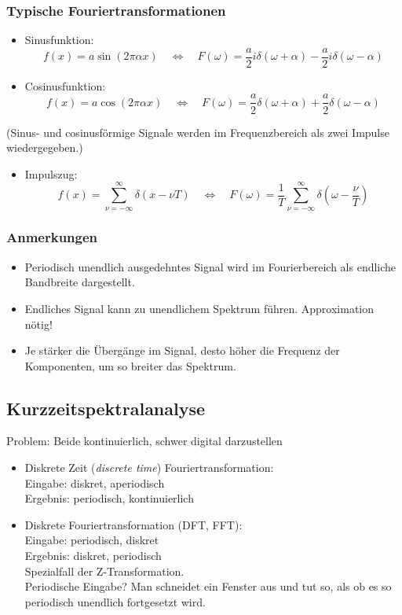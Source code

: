 \subsubsection*{Typische Fouriertransformationen}
\begin{itemize}
\item Sinusfunktion: $$f(x) = a \sin(2 \pi \alpha x) \quad \Leftrightarrow \quad F(\omega) = \frac{a}{2}i \delta(\omega + \alpha) - \frac{a}{2}i \delta(\omega - \alpha)$$
\item Cosinusfunktion: $$f(x) = a \cos(2 \pi \alpha x) \quad \Leftrightarrow \quad F(\omega) = \frac{a}{2} \delta(\omega + \alpha) + \frac{a}{2} \delta(\omega - \alpha)$$
\end{itemize}
(Sinus- und cosinusförmige Signale werden im Frequenzbereich als zwei Impulse wiedergegeben.)
\begin{itemize}
\item Impulszug: $$f(x) = \sum\limits_{\nu = -\infty}^{\infty} \delta(x - \nu T) \quad \Leftrightarrow \quad F(\omega) = \frac{1}{T} \sum\limits_{\nu = -\infty}^{\infty} \delta(\omega - \frac{\nu}{T})$$
\end{itemize}

\subsubsection*{Anmerkungen}
\begin{itemize}
\item Periodisch unendlich ausgedehntes Signal wird im Fourierbereich als endliche Bandbreite dargestellt.
\item Endliches Signal kann zu unendlichem Spektrum führen. Approximation nötig!
\item Je stärker die Übergänge im Signal, desto höher die Frequenz der Komponenten, um so breiter das Spektrum.
\end{itemize}


\subsection{Kurzzeitspektralanalyse}

Problem: Beide kontinuierlich, schwer digital darzustellen
\begin{itemize}
\item Diskrete Zeit (\textsl{discrete time}) Fouriertransformation: \\ Eingabe: diskret, aperiodisch \\ Ergebnis: periodisch, kontinuierlich
\item Diskrete Fouriertransformation (DFT, FFT): \\ Eingabe: periodisch, diskret \\ Ergebnis: diskret, periodisch \\ Spezialfall der Z-Transformation. \\ Periodische Eingabe? Man schneidet ein Fenster aus und tut so, als ob es so periodisch unendlich fortgesetzt wird.
\end{itemize}

